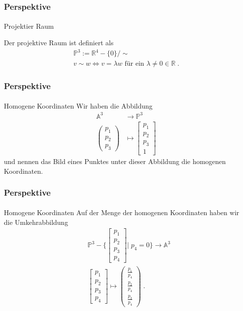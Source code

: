 \documentclass{beamer}
\begin{document}
\begin{frame}
    \frametitle{Perspektive}
\framesubtitle{}
\begin{block}{Projektier Raum}

Der projektive  Raum ist definiert als
\begin{align*}
\mathbb{P}^3 := \mathbb{R}^{4} - \{ 0\} / \sim \\
v \sim w \Leftrightarrow v = \lambda w \text{ für ein } \lambda \neq 0 \in \mathbb{R} \; . 
\end{align*}
\end{block}
\end{frame}

\begin{frame}
    \frametitle{Perspektive}
\framesubtitle{}
\begin{block}{Homogene Koordinaten}
Wir haben die Abbildung
\begin{align*}
\mathbb{A}^3 & \to \mathbb{P}^3 \\
\begin{pmatrix} p_1 \\ p_2 \\ p_3 \end{pmatrix} & \mapsto \begin{bmatrix} p_1 \\ p_2 \\ p_3  \\  1\end{bmatrix} 
\end{align*}
und nennen das Bild eines Punktes unter dieser Abbildung die homogenen Koordinaten.
\end{block}
\end{frame}

\begin{frame}
    \frametitle{Perspektive}
\framesubtitle{}
\begin{block}{Homogene Koordinaten}
Auf der Menge der homogenen Koordinaten haben wir die Umkehrabbildung
\begin{align*}
& \mathbb{P}^3 - \Biggl \{\begin{bmatrix} p_1 \\ p_2 \\ p_3  \\ p_4 \end{bmatrix}\Bigg | \; p_{4} = 0 \Biggr \}   \to \mathbb{A}^3 \\
& \begin{bmatrix} p_1 \\ p_2 \\ p_3  \\  p_{4} \end{bmatrix}   \mapsto \begin{pmatrix}  \frac{p_1}{ p_{4}} \\ \frac{p_2}{ p_{4}}  \\ \frac{p_3}{ p_{4}}  \end{pmatrix}  \; .
\end{align*}
\end{block}
\end{frame}
\end{document}
